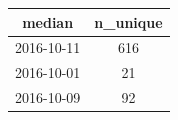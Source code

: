 \documentclass[]{book}
\theoremstyle{definition}
\theoremstyle{definition}
\theoremstyle{definition}
\theoremstyle{remark}
\begin{document}
\begin{longtable}[]{@{}cc@{}}
\toprule
\begin{minipage}[b]{0.17\columnwidth}\centering\strut
median\strut
\end{minipage} & \begin{minipage}[b]{0.13\columnwidth}\centering\strut
n\_unique\strut
\end{minipage}\tabularnewline
\midrule
\endhead
\begin{minipage}[t]{0.17\columnwidth}\centering\strut
2016-10-11\strut
\end{minipage} & \begin{minipage}[t]{0.13\columnwidth}\centering\strut
616\strut
\end{minipage}\tabularnewline
\begin{minipage}[t]{0.17\columnwidth}\centering\strut
2016-10-01\strut
\end{minipage} & \begin{minipage}[t]{0.13\columnwidth}\centering\strut
21\strut
\end{minipage}\tabularnewline
\begin{minipage}[t]{0.17\columnwidth}\centering\strut
2016-10-09\strut
\end{minipage} & \begin{minipage}[t]{0.13\columnwidth}\centering\strut
92\strut
\end{minipage}\tabularnewline
\bottomrule
\end{longtable}
\end{document}
